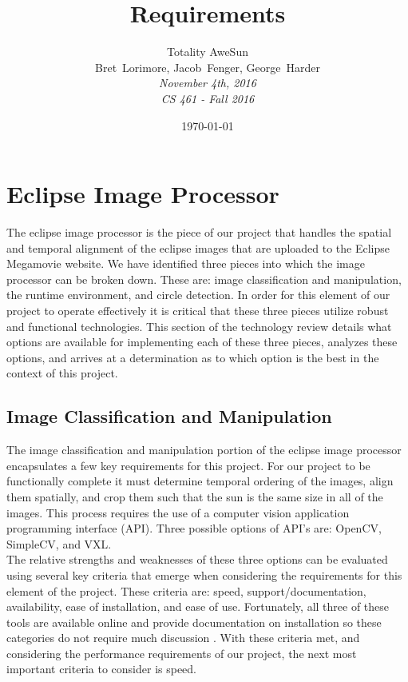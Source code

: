 \documentclass[10pt, onecolumn, draftclsnofoot, letterpaper, compsoc]{IEEEtran}
\title{Requirements}
\date{\today} %
\author{Totality AweSun \\
		Bret~Lorimore, Jacob~Fenger, George~Harder \\
		\textit{November 4th, 2016 \\
		CS 461 - Fall 2016}}
\begin{document}

\maketitle

\section{Eclipse Image Processor}

The eclipse image processor is the piece of our project that handles the spatial
and temporal alignment of the eclipse images that are uploaded to the Eclipse
Megamovie website. We have identified three pieces into which
the image processor can be broken down. These are: image classification and
manipulation, the runtime environment, and circle detection. In order for this
element of our project to operate effectively it is critical that these three
pieces utilize robust and functional technologies. This section of the
technology review details what options are available for implementing each of
these three pieces, analyzes these options, and arrives at a determination as to
which option is the best in the context of this project.\\

\subsection{Image Classification and Manipulation}

The image classification and manipulation portion of the eclipse image processor
encapsulates a few key requirements for this project. For our project to be
functionally complete it must determine temporal ordering of the images, align
them spatially, and crop them such that the sun is the same size in all of the
images. This process requires the use of a computer vision application
programming interface (API). Three possible options of API's are: OpenCV,
SimpleCV, and VXL. \\

The relative strengths and weaknesses of these three options can be evaluated
using several key criteria that emerge when considering the requirements for
this element of the project. These criteria are: speed, support/documentation,
availability, ease of installation, and ease of use. Fortunately, all three of
these tools are available online and provide documentation on installation so
these categories do not require much discussion \cite{OCV, VXL, SCV}. With these
criteria met, and considering the performance requirements of our project, the
next most important criteria to consider is speed. \\
\end{document}
